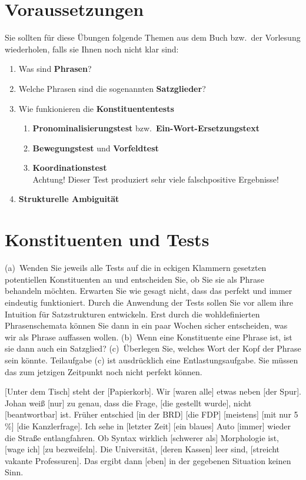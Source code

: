 \section*{Voraussetzungen}

Sie sollten für diese Übungen folgende Themen aus dem Buch bzw.\ der Vorlesung wiederholen, falls sie Ihnen noch nicht klar sind:

\begin{enumerate}\Lf
  \item Was sind \textbf{Phrasen}?
  \item Welche Phrasen sind die sogenannten \textbf{Satzglieder}?
  \item Wie funkionieren die \textbf{Konstituententests}
    \begin{enumerate}\Lf
      \item \textbf{Pronominalisierungstest} bzw.\ \textbf{Ein-Wort-Ersetzungstext}
      \item \textbf{Bewegungstest} und \textbf{Vorfeldtest}
      \item \textbf{Koordinationstest}\\
        Achtung! Dieser Test produziert sehr viele falschpositive Ergebnisse!
    \end{enumerate}
  \item \textbf{Strukturelle Ambiguität}
\end{enumerate}

\section{Konstituenten und Tests}

(a)~Wenden Sie jeweils alle Tests auf die in eckigen Klammern gesetzten potentiellen Konstituenten an und entscheiden Sie, ob Sie sie als Phrase behandeln möchten.
Erwarten Sie wie gesagt nicht, dass das perfekt und immer eindeutig funktioniert.
Durch die Anwendung der Tests sollen Sie vor allem ihre Intuition für Satzstrukturen entwickeln.
Erst durch die wohldefinierten Phrasenschemata können Sie dann in ein paar Wochen sicher entscheiden, was wir als Phrase auffassen wollen.
(b)~Wenn eine Konstituente eine Phrase ist, ist sie dann auch ein Satzglied?
(c)~Überlegen Sie, welches Wort der Kopf der Phrase sein könnte.
Teilaufgabe (c) ist ausdrücklich eine Entlastungsaufgabe.
Sie müssen das zum jetzigen Zeitpunkt noch nicht perfekt können.

\begin{exe}
  \ex{} [Unter dem Tisch] steht der [Papierkorb].
  \ex{} Wir [waren alle] etwas neben [der Spur].
  \ex{} Johan weiß [nur] zu genau, dass die Frage, [die gestellt wurde], nicht [beantwortbar] ist.
  \ex{} Früher entschied [in der BRD] [die FDP] [meistens] [mit nur 5 \%] [die Kanzlerfrage]. 
  \ex{} Ich sehe in [letzter Zeit] [ein blaues] Auto [immer] wieder die Straße entlangfahren.
  \ex{} Ob Syntax wirklich [schwerer als] Morphologie ist, [wage ich] [zu bezweifeln].
  \ex{} Die Universität, [deren Kassen] leer sind, [streicht vakante Professuren].
  \ex{} Das ergibt dann [eben] in der gegebenen Situation keinen Sinn.
\end{exe}


